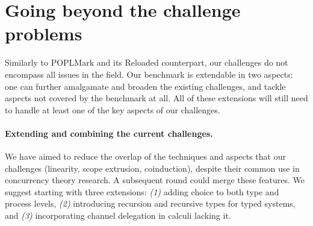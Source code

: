 \documentclass[runningheads]{llncs}
\begin{document}
\section{Going beyond the challenge problems}\label{sec:going-beyond}
Similarly to POPLMark and its Reloaded counterpart, our challenges do not encompass all issues in the field.
Our benchmark is extendable in two aspects: one can further amalgamate and broaden the existing challenges, and tackle aspects not covered by the benchmark at all.
All of these extensions will still need to handle at least one of the key aspects of our challenges.

\paragraph{Extending and combining the current challenges.}

We have aimed to reduce the overlap of the techniques and aspects that
our challenges (linearity, scope extrusion, coinduction), despite
their common use in concurrency theory research. A subsequent round
could merge these features. We suggest starting with three extensions:
\emph{(1)} adding choice to both type and process levels, \emph{(2)}
introducing recursion and recursive types for typed systems, and
\emph{(3)} incorporating channel delegation in calculi lacking it.

\end{document}
